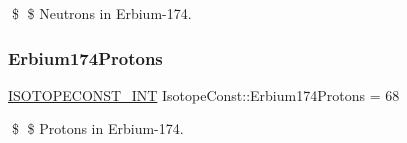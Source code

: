 \$ \$ Neutrons in Erbium-\/174. \mbox{\label{group___isotope_const-_erbium-_er174_ga2ceec8ce8fda4beff13d56c1afeceb33}} 
\subsubsection{\texorpdfstring{Erbium174\+Protons}{Erbium174Protons}}
{\footnotesize\ttfamily \mbox{\hyperlink{group___isotope_const-_macros_ga5f18360b3e99483a35c32d789e62621c}{I\+S\+O\+T\+O\+P\+E\+C\+O\+N\+S\+T\+\_\+\+I\+NT}} Isotope\+Const\+::\+Erbium174\+Protons = 68}

\$ \$ Protons in Erbium-\/174. 